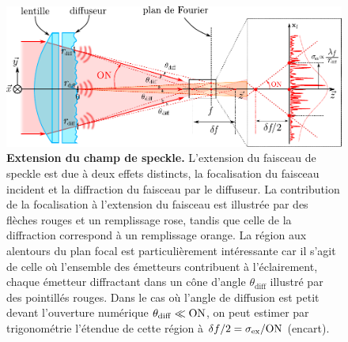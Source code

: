 \begin{figure}
\centering
\includegraphics[width=\textwidth]{Fig/Speckle/speckle_extension.pdf}
\caption{\textbf{Extension du champ de speckle.} L'extension du faisceau de speckle est due à deux effets distincts, la focalisation du faisceau incident et la diffraction du faisceau par le diffuseur. La contribution de la focalisation à l'extension du faisceau est illustrée par des flèches rouges et un remplissage rose, tandis que celle de la diffraction correspond à un remplissage orange. La région aux alentours du plan focal est particulièrement intéressante car il s'agit de celle où l'ensemble des émetteurs contribuent à l'éclairement, chaque émetteur diffractant dans un cône d'angle $\theta_{\mathrm{diff}}$ illustré par des pointillés rouges. Dans le cas où l'angle de diffusion est petit devant l'ouverture numérique $\theta_{\mathrm{diff}} \ll \mathrm{ON}$, on peut estimer par trigonométrie l'étendue de cette région à $\delta f/2= \sigma_{\mathrm{ex}} / \mathrm{ON}$ (encart).}
\label{fig:speckle_extension}
\end{figure}

